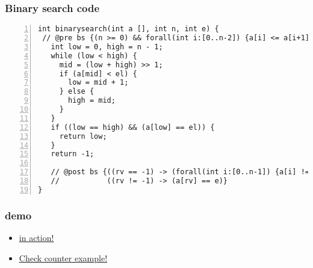 \begin{frame}[containsverbatim]
\frametitle{Binary search code}
\begin{Verbatim}[fontsize=\relsize{-2.5}, numbersep=4pt,numbers=left]
int binarysearch(int a [], int n, int e) {
 // @pre bs {(n >= 0) && forall(int i:[0..n-2]) {a[i] <= a[i+1]}}
   int low = 0, high = n - 1;
   while (low < high) {
     mid = (low + high) >> 1;
     if (a[mid] < el) {
       low = mid + 1;
     } else {
       high = mid;
     }
   }  
   if ((low == high) && (a[low] == el)) {
     return low;
   } 
   return -1;
   
   // @post bs {((rv == -1) -> (forall(int i:[0..n-1]) {a[i] != e}) &&
   //           ((rv != -1) -> (a[rv] == e)}
}
\end{Verbatim}
\end{frame}


\begin{frame}[c]
 \frametitle{\mytool{} demo}
 \begin{itemize}
  \item 
  \href{run:/home/mohamad/Desktop/Demo/BinarySearch.avi}{\mytool{} in action!} 
  \item 
  \href{run:/home/mohamad/Desktop/Demo/CounterEx.avi}{Check counter example!}
 \end{itemize} 
\end{frame}



